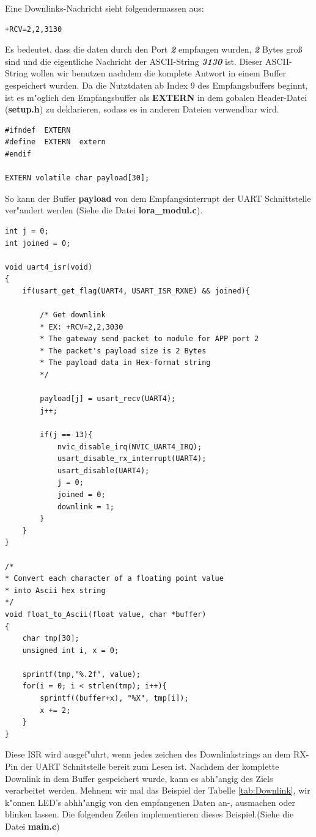 Eine Downlinks-Nachricht sieht folgendermassen aus: 

\begin{lstlisting}[frame=single]
+RCV=2,2,3130
\end{lstlisting}
Es bedeutet, dass die daten durch den Port \textbf{\textit{2}} empfangen wurden, 
\textbf{\textit{2}} Bytes gro\ss{} sind und die eigentliche Nachricht der ASCII-String 
\textbf{\textit{3130}} ist. Dieser ASCII-String wollen wir benutzen nachdem die komplete 
Antwort in einem Buffer gespeichert wurden. Da die Nutztdaten ab Index 9 des Empfangsbuffers beginnt, ist es m"oglich den Empfangsbuffer als \textbf{EXTERN} in dem gobalen Header-Datei (\textbf{setup.h}) zu deklarieren, sodass es in anderen Dateien verwendbar wird.  

\begin{lstlisting}[frame=single]
#ifndef  EXTERN
#define  EXTERN  extern
#endif

EXTERN volatile char payload[30];
\end{lstlisting}
So kann der Buffer \textbf{payload} von dem Empfangsinterrupt der UART Schnittstelle ver"andert werden (Siehe die Datei \textbf{lora\_modul.c}).

\begin{lstlisting}[frame=single]
int j = 0;
int joined = 0;

void uart4_isr(void)
{
	if(usart_get_flag(UART4, USART_ISR_RXNE) && joined){

		/* Get downlink
		* EX: +RCV=2,2,3030
		* The gateway send packet to module for APP port 2
		* The packet's payload size is 2 Bytes
		* The payload data in Hex-format string
		*/
	
		payload[j] = usart_recv(UART4);
		j++;

		if(j == 13){
			nvic_disable_irq(NVIC_UART4_IRQ);
			usart_disable_rx_interrupt(UART4);
			usart_disable(UART4);
			j = 0;
			joined = 0;
			downlink = 1;
		}
	}
}

/*
* Convert each character of a floating point value
* into Ascii hex string
*/
void float_to_Ascii(float value, char *buffer)
{
	char tmp[30];
	unsigned int i, x = 0;
	
	sprintf(tmp,"%.2f", value); 
	for(i = 0; i < strlen(tmp); i++){ 
		sprintf((buffer+x), "%X", tmp[i]); 
		x += 2;
	}
}

\end{lstlisting}
Diese \ac{ISR} wird ausgef"uhrt, wenn jedes zeichen des Downlinkstrings an dem RX-Pin der UART Schnitstelle bereit zum Lesen ist.
Nachdem der komplette Downlink in dem Buffer gespeichert wurde, kann es abh"angig des Ziels 
verarbeitet werden. Mehnem wir mal das Beispiel der Tabelle 
\ref{tab:Downlink}, wir k"onnen LED's abhh"angig von den empfangenen Daten an-, 
ausmachen oder blinken lassen. Die folgenden Zeilen implementieren dieses Beispiel.(Siehe die Datei \textbf{main.c})

